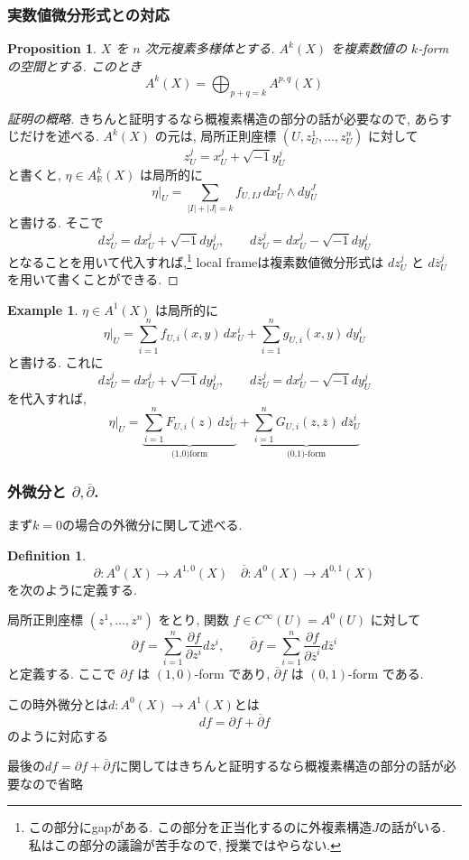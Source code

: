 \documentclass[dvipdfmx,a4paper,11pt]{article} %
\newtheorem{prop}[thm]{Proposition}
\theoremstyle{definition}
\newtheorem{defn}[thm]{Definition}
\newtheorem{example}[thm]{Example}
\theoremstyle{remark}
\numberwithin{equation}{section}
\begin{document}
\subsubsection{実数値微分形式との対応}

\begin{prop}
\(X\) を \(n\) 次元複素多様体とする. \(A^{k}(X)\) を複素数値の \(k\)-form の空間とする. このとき
\[
A^{k}(X) = \bigoplus_{p+q=k}A^{p,q}(X)
\]
\end{prop}
\begin{proof}[証明の概略]
きちんと証明するなら概複素構造の部分の話が必要なので, あらすじだけを述べる. \(A^{k}(X)\) の元は, 局所正則座標 \((U,z_U^1,\ldots,z_U^n)\) に対して
\[
z_U^j=x_U^j+\sqrt{-1}y_U^j
\]
と書くと, \(\eta\in A^k_{\mathbb{R}}(X)\) は局所的に
\[
\eta|_{U}=\sum_{|I|+|J|=k}f_{U,IJ}\,dx_U^I\wedge dy_U^J
\]
と書ける. そこで
\[
dz_U^j=dx_U^j+\sqrt{-1}dy_U^j,\qquad d\overline{z}_U^j=dx_U^j-\sqrt{-1}dy_U^j
\]
となることを用いて代入すれば,\footnote{この部分にgapがある. この部分を正当化するのに外複素構造$J$の話がいる. 私はこの部分の議論が苦手なので, 授業ではやらない. } local frameは複素数値微分形式は \(dz_U^j\) と \(d\overline{z}_U^j\) を用いて書くことができる.
\end{proof}
\begin{example}
\(\eta \in A^{1}(X)\) は局所的に
\[
\eta|_{U}=\sum_{i=1}^{n} f_{U,i}(x, y)\,dx^i_U + \sum_{i=1}^{n} g_{U,i}(x,y)\,dy^i_U 
\]
と書ける. これに
\[
dz_U^j=dx_U^j+\sqrt{-1}dy_U^j,\qquad d\overline{z}_U^j=dx_U^j-\sqrt{-1}dy_U^j
\]
を代入すれば,
\[
\eta|_{U}=\underbrace{\sum_{i=1}^{n} F_{U,i}(z)\,dz^i_U}_{\text{(1,0)form}} + 
\underbrace{\sum_{i=1}^{n} G_{U,i}(z,\overline{z})\,d\overline z_U^i}_{\text{(0,1)-form}}
\]
\end{example}


\subsubsection{外微分と \(\partial,\overline{\partial}\).}

まず$k=0$の場合の外微分に関して述べる.
\begin{defn}
$$
\partial : A^0(X) \to A^{1,0}(X) \quad 
\overline{\partial} : A^0(X) \to A^{0,1}(X)  
$$
を次のように定義する. 

局所正則座標 \((z^1,\ldots,z^n)\) をとり, 
 関数 \(f\in C^\infty(U)=A^0(U)\) に対して
\[
\partial f=\sum_{i=1}^n \frac{\partial f}{\partial z^i}dz^i,\qquad
\overline{\partial}f=\sum_{i=1}^n \frac{\partial f}{\partial \overline{z}^i}d\overline{z}^i
\]
と定義する. 
ここで \(\partial f\) は \((1,0)\)-form であり, \(\overline{\partial}f\) は \((0,1)\)-form である.

この時外微分とは$d: A^0(X) \to A^1(X)$とは
\[
df=\partial f+\overline{\partial}f
\]
のように対応する
\end{defn}
最後の$df=\partial f+\overline{\partial}f
$に関してはきちんと証明するなら概複素構造の部分の話が必要なので省略
\end{document}
